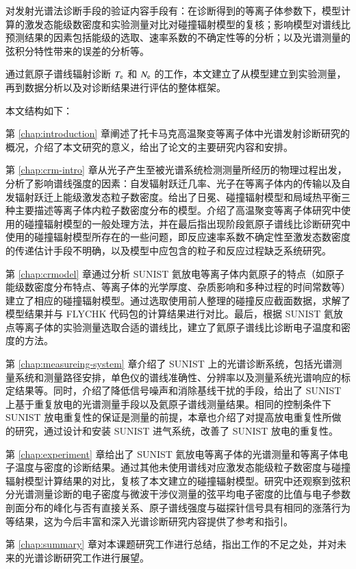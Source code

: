 对发射光谱法诊断手段的验证内容手段有：在诊断得到的等离子体参数下，模型计算的激发态能级数密度和实验测量对比对碰撞辐射模型的复核；影响模型对谱线比预测结果的因素\pozhehao 包括能级的选取、速率系数的不确定性等\pozhehao 的分析；以及光谱测量的弦积分特性带来的误差的分析等。


通过氦原子谱线辐射诊断 $T_{\rm e}$ 和 $N_{\rm e}$ 的工作，本文建立了从模型建立到实验测量，再到数据分析以及对诊断结果进行评估的整体框架。

本文结构如下：

第 \ref{chap:introduction} 章阐述了托卡马克高温聚变等离子体中光谱发射诊断研究的概况，介绍了本文研究的意义，给出了论文的主要研究内容和安排。

第 \ref{chap:crm-intro} 章从光子产生至被光谱系统检测测量所经历的物理过程出发，分析了影响谱线强度的因素：自发辐射跃迁几率、光子在等离子体内的传输以及自发辐射跃迁上能级激发态粒子数密度。给出了日冕、碰撞辐射模型和局域热平衡三种主要描述等离子体内粒子数密度分布的模型。介绍了高温聚变等离子体研究中使用的碰撞辐射模型的一般处理方法，并在最后指出现阶段氦原子谱线比诊断研究中使用的碰撞辐射模型所存在的一些问题，即反应速率系数不确定性至激发态数密度的传递估计手段不明确，以及模型中应包含的粒子和反应过程缺乏系统研究。

第 \ref{chap:crmodel} 章通过分析 SUNIST 氦放电等离子体内氦原子的特点（如原子能级数密度分布特点、等离子体的光学厚度、杂质影响和多种过程的时间常数等）建立了相应的碰撞辐射模型。通过选取使用前人整理的碰撞反应截面数据，求解了模型结果并与 FLYCHK 代码包的计算结果进行对比。最后，根据 SUNIST 氦放点等离子体的实验测量选取合适的谱线比，建立了氦原子谱线比诊断电子温度和密度的方法。

第 \ref{chap:measureing-system} 章介绍了 SUNIST 上的光谱诊断系统，包括光谱测量系统和测量路径安排，单色仪的谱线准确性、分辨率以及测量系统光谱响应的标定结果等。同时，介绍了降低信号噪声和消除基线干扰的手段，给出了 SUNIST 上基于重复放电的光谱测量手段以及氦原子谱线测量结果。相同的控制条件下 SUNIST 放电重复性的保证是测量的前提，本章也介绍了对提高放电重复性所做的研究，通过设计和安装 SUNIST 进气系统，改善了 SUNIST 放电的重复性。

第 \ref{chap:experiment} 章给出了 SUNIST 氦放电等离子体的光谱测量和等离子体电子温度与密度的诊断结果。通过其他未使用谱线对应激发态能级粒子数密度与碰撞辐射模型计算结果的对比，复核了本文建立的碰撞辐射模型。研究中还观察到弦积分光谱测量诊断的电子密度与微波干涉仪测量的弦平均电子密度的比值与电子参数剖面分布的峰化与否有直接关系、原子谱线强度与磁探针信号具有相同的涨落行为等结果，这为今后丰富和深入光谱诊断研究内容提供了参考和指引。

第 \ref{chap:summary} 章对本课题研究工作进行总结，指出工作的不足之处，并对未来的光谱诊断研究工作进行展望。

